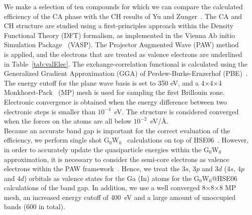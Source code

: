 \begin{refsection}
We make a selection of ten compounds for which we can compare the calculated efficiency of the CA phase with the CH results of Yu and Zunger~\cite{Yu2012}. The CA and CH structure are studied using a first-principles approach within the Density Functional Theory (DFT) formalism, as implemented in the Vienna Ab initio Simulation Package~\cite{Kresse1993, Kresse1996, Kresse1996b} (VASP). The Projector Augmented Wave (PAW) method~\cite{Blchl1994} is applied, and the electrons that are treated as valence electrons are underlined in Table~\ref{tab:valElec}. The exchange-correlation functional is calculated using the Generalized Gradient Approximation (GGA) of Perdew-Burke-Ernzerhof (PBE)~\cite{Perdew1996}. The energy cutoff for the plane wave basis is set to 350 eV, and a 4$\times$4$\times$4 Monkhorst-Pack~\cite{Monkhorst1976} (MP) mesh is used for sampling the first Brillouin zone. Electronic convergence is obtained when the energy difference between two electronic steps is smaller than $10^{-4}$~\si{\electronvolt}. The structure is considered converged when the forces on the atoms are all below $10^{-2}$~\si{\electronvolt}/\si{\angstrom}. \\\vspace{0.5em}
Because an accurate band gap is important for the correct evaluation of the efficiency, we perform single shot G$_0$W$_0$~\cite{Hybertsen1985} calculations on top of HSE06~\cite{Heyd2006}. However, in order to accurately update the quasiparticle energies within the G$_0$W$_0$ approximation, it is necessary to consider the semi-core electrons as valence electrons within the PAW framework~\cite{Fuchs2007}. Hence, we treat the 3$s$, 3$p$ and 3$d$ (4$s$, 4$p$ and 4$d$) orbitals as valence states for the Ga (In) atoms for the G$_0$W$_0$@HSE06 calculations of the band gap. In addition, we use a well converged 8$\times$8$\times$8 MP mesh, an increased energy cutoff of 400~\si{\electronvolt} and a large amount of unoccupied bands (600 in total). \\\vspace{0.5em}

\end{refsection}
